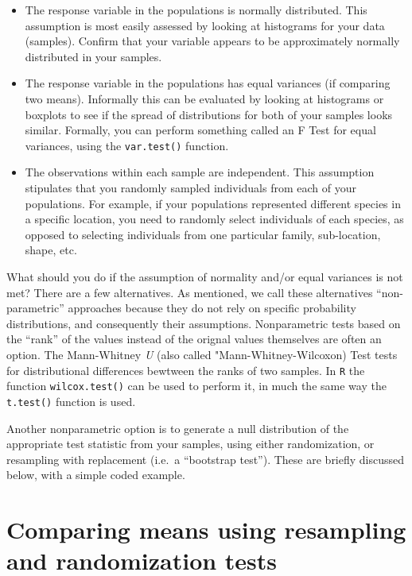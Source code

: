 \documentclass[]{book}
\begin{document}
\begin{itemize}
\item
  The response variable in the populations is normally distributed. This assumption is most easily assessed by looking at histograms for your data (samples). Confirm that your variable appears to be approximately normally distributed in your samples.
\item
  The response variable in the populations has equal variances (if comparing two means). Informally this can be evaluated by looking at histograms or boxplots to see if the spread of distributions for both of your samples looks similar. Formally, you can perform something called an F Test for equal variances, using the \texttt{var.test()} function.
\item
  The observations within each sample are independent. This assumption stipulates that you randomly sampled individuals from each of your populations. For example, if your populations represented different species in a specific location, you need to randomly select individuals of each species, as opposed to selecting individuals from one particular family, sub-location, shape, etc.
\end{itemize}

What should you do if the assumption of normality and/or equal variances is not met? There are a few alternatives. As mentioned, we call these alternatives ``non-parametric'' approaches because they do not rely on specific probability distributions, and consequently their assumptions. Nonparametric tests based on the ``rank'' of the values instead of the orignal values themselves are often an option. The Mann-Whitney \emph{U} (also called "Mann-Whitney-Wilcoxon) Test tests for distributional differences bewtween the ranks of two samples. In \texttt{R} the function \texttt{wilcox.test()} can be used to perform it, in much the same way the \texttt{t.test()} function is used.

Another nonparametric option is to generate a null distribution of the appropriate test statistic from your samples, using either randomization, or resampling with replacement (i.e.~a ``bootstrap test''). These are briefly discussed below, with a simple coded example.

\hypertarget{comparing-means-using-resampling-and-randomization-tests}{%
\section{Comparing means using resampling and randomization tests}\label{comparing-means-using-resampling-and-randomization-tests}}
\end{document}
